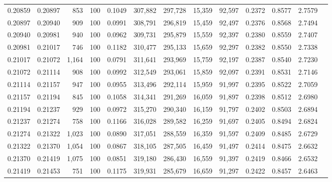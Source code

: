 \begin{tabular}{rrrrrrrrrrrrr}
0.20859 & 0.20897 &   853 & 100 &                                     0.1049 & 307,882 & 297,728 &  15,359 &  92,597 & 0.2372 & 0.8577 & 2.7579 \\
0.20897 & 0.20940 &   909 & 100 &                                     0.0991 & 308,791 & 296,819 &  15,459 &  92,497 & 0.2376 & 0.8568 & 2.7494 \\
0.20940 & 0.20981 &   940 & 100 &                                     0.0962 & 309,731 & 295,879 &  15,559 &  92,397 & 0.2380 & 0.8559 & 2.7407 \\
0.20981 & 0.21017 &   746 & 100 &                                     0.1182 & 310,477 & 295,133 &  15,659 &  92,297 & 0.2382 & 0.8550 & 2.7338 \\
0.21017 & 0.21072 & 1,164 & 100 &                                     0.0791 & 311,641 & 293,969 &  15,759 &  92,197 & 0.2387 & 0.8540 & 2.7230 \\
0.21072 & 0.21114 &   908 & 100 &                                     0.0992 & 312,549 & 293,061 &  15,859 &  92,097 & 0.2391 & 0.8531 & 2.7146 \\
0.21114 & 0.21157 &   947 & 100 &                                     0.0955 & 313,496 & 292,114 &  15,959 &  91,997 & 0.2395 & 0.8522 & 2.7059 \\
0.21157 & 0.21194 &   845 & 100 &                                     0.1058 & 314,341 & 291,269 &  16,059 &  91,897 & 0.2398 & 0.8512 & 2.6980 \\
0.21194 & 0.21237 &   929 & 100 &                                     0.0972 & 315,270 & 290,340 &  16,159 &  91,797 & 0.2402 & 0.8503 & 2.6894 \\
0.21237 & 0.21274 &   758 & 100 &                                     0.1166 & 316,028 & 289,582 &  16,259 &  91,697 & 0.2405 & 0.8494 & 2.6824 \\
0.21274 & 0.21322 & 1,023 & 100 &                                     0.0890 & 317,051 & 288,559 &  16,359 &  91,597 & 0.2409 & 0.8485 & 2.6729 \\
0.21322 & 0.21370 & 1,054 & 100 &                                     0.0867 & 318,105 & 287,505 &  16,459 &  91,497 & 0.2414 & 0.8475 & 2.6632 \\
0.21370 & 0.21419 & 1,075 & 100 &                                     0.0851 & 319,180 & 286,430 &  16,559 &  91,397 & 0.2419 & 0.8466 & 2.6532 \\
0.21419 & 0.21453 &   751 & 100 &                                     0.1175 & 319,931 & 285,679 &  16,659 &  91,297 & 0.2422 & 0.8457 & 2.6463 \\

\end{tabular}
